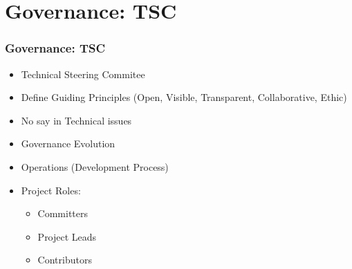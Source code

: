 \section{Governance: TSC}

\begin{frame}[allowframebreaks]
\frametitle{Governance: TSC}

\begin{itemize}
 \item Technical Steering Commitee
 \item Define Guiding Principles (Open, Visible, Transparent, Collaborative, Ethic)
 \item No say in Technical issues
 \item Governance Evolution
 \item Operations (Development Process)
 \item Project Roles:
 \begin{itemize}
   \item Committers
   \item Project Leads
   \item Contributors
 \end{itemize}
\end{itemize}

\end{frame}
